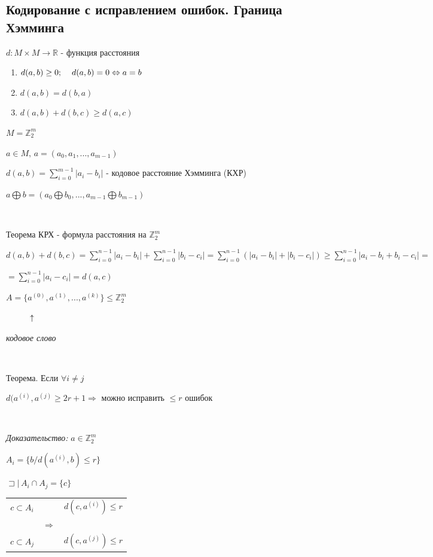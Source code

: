 \documentclass[12pt]{article}
\begin{document}
\subsection{Кодирование с исправлением ошибок. Граница Хэмминга}
$d:M\times M \rightarrow \mathbb{R}$ - функция расстояния
\begin{enumerate}
    \item $d(a,b) \geq 0; \hspace{4 mm} d(a,b) = 0 \Leftrightarrow a = b$
    \item $d(a,b) = d(b,a)$
    \item $d(a,b) + d(b,c) \geq d(a,c)$
\end{enumerate}\par
$M = \mathbb{Z}_2^m$\par
$a \in M, \,a = (a_0, a_1, ..., a_{m-1})$\par
$d(a,b) = \sum\limits_{i=0}^{m-1} |a_i - b_i|$ - кодовое расстояние Хэмминга (КХР)\par
$a \bigoplus b = (a_0 \bigoplus b_0, ... , a_{m-1} \bigoplus b_{m-1})$\par
$ $\par
Теорема КРХ - формула расстояния на $\mathbb{Z}_2^m$\par
$d(a,b)+d(b,c) = \sum\limits_{i=0}^{n-1}|a_i - b_i|+\sum\limits_{i=0}^{n-1}|b_i - c_i|=\sum\limits_{i=0}^{n-1}(|a_i - b_i|+|b_i - c_i|) \geq \sum\limits_{i=0}^{n-1}|a_i - b_i + b_i - c_i| =$\par
$ =\sum\limits_{i=0}^{n-1}|a_i - c_i| = d(a,c)$\par
$A=\{a^{(0)}, a^{(1)}, ... , a^{(k)}\} \leq \mathbb{Z}_2^m$\par
$\hspace{1 cm} \uparrow$\par
\textit{кодовое слово}\par
$ $\par
Теорема. Если $\forall i \neq j$\par
$d(a^{(i)},a^{(j)} \geq 2r+1 \Rightarrow$ можно исправить $\leq r$ ошибок \par
$ $\par
\textit{Доказательство:} $a \in \mathbb{Z}_2^m$\par
$A_i = \{ b / d(a^{(i)}, b) \leq r \}$\par
$\sqsupset | \, A_i \cap A_j = \{ c \}$\par
\begin{tabular}{c|cc}
    $c \subset A_i$ &               & $d(c,a^{(i)}) \leq r$ \\
                    & $\Rightarrow$                         \\
    $c \subset A_j$ &               & $d(c,a^{(j)}) \leq r$ \\
\end{tabular}\par
\end{document}

